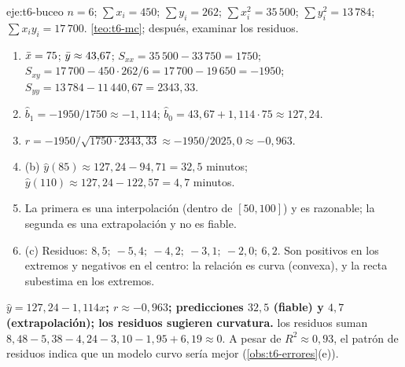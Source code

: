 \begin{solucion}{eje:t6-buceo}
\datos $n=6$; $\sum x_i=450$; $\sum y_i=262$; $\sum x_i^{2}=35\,500$; $\sum y_i^{2}=13\,784$; $\sum x_iy_i=17\,700$.
\planteamiento \cref{teo:t6-mc}; después, examinar los residuos.
\pasos
\begin{enumerate}[label=\arabic*.]
  \item $\bar{x}=75$; $\bar{y}\approx43{,}67$; $S_{xx}=35\,500-33\,750=1750$; $S_{xy}=17\,700-450\cdot262/6=17\,700-19\,650=-1950$; $S_{yy}=13\,784-11\,440{,}67=2343{,}33$.
  \item $\widehat b_1=-1950/1750\approx-1{,}114$; $\widehat b_0=43{,}67+1{,}114\cdot75\approx127{,}24$.
  \item $r=-1950/\sqrt{1750\cdot2343{,}33}\approx-1950/2025{,}0\approx-0{,}963$.
  \item (b) $\widehat y(85)\approx127{,}24-94{,}71=32{,}5$ minutos; $\widehat y(110)\approx127{,}24-122{,}57=4{,}7$ minutos.
  \item La primera es una interpolación (dentro de $[50,100]$) y es razonable; la segunda es una extrapolación y no es fiable.
  \item (c) Residuos: $8{,}5;\allowbreak\ -5{,}4;\allowbreak\ -4{,}2;\allowbreak\ -3{,}1;\allowbreak\ -2{,}0;\allowbreak\ 6{,}2$. Son positivos en los extremos y negativos en el centro: la relación es curva (convexa), y la recta subestima en los extremos.
\end{enumerate}
\resultado \textbf{$\widehat y=127{,}24-1{,}114x$; $r\approx-0{,}963$; predicciones $32{,}5$ (fiable) y $4{,}7$ (extrapolación); los residuos sugieren curvatura.}
\comprobacion los residuos suman $8{,}48-5{,}38-4{,}24-3{,}10-1{,}95+6{,}19\approx0$. A pesar de $R^{2}\approx0{,}93$, el patrón de residuos indica que un modelo curvo sería mejor (\cref{obs:t6-errores}(e)).
\end{solucion}

